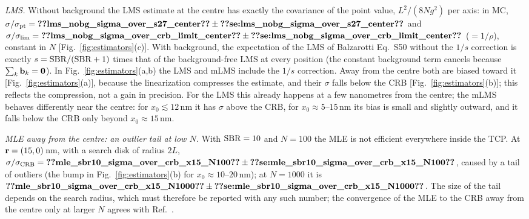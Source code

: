 \emph{LMS.} Without background the LMS estimate at the centre has exactly the covariance of the
point value, $L^2/(8Ng^2)$ per axis: in MC,
$\sigma/\sigma_{\mathrm{pt}}=\pnum{lms_nobg_sigma_over_s27_center}\pm\pnumse{lms_nobg_sigma_over_s27_center}$
and $\sigma/\sigma_{\lim}=\pnum{lms_nobg_sigma_over_crb_limit_center}\pm\pnumse{lms_nobg_sigma_over_crb_limit_center}$
($=1/\rho$), constant in $N$ [Fig.~\ref{fig:estimators}(c)]. With background, the expectation of the LMS of
Balzarotti Eq.~S50 without the $1/s$ correction is exactly $s=\mathrm{SBR}/(\mathrm{SBR}+1)$ times that of the
background-free LMS at every position (the constant background term cancels
because $\sum_k\mathbf{b}_k=\mathbf0$). In Fig.~\ref{fig:estimators}(a,b) the LMS and mLMS include the
$1/s$ correction. Away from the centre both are biased toward it
[Fig.~\ref{fig:estimators}(a)], because the linearization compresses the estimate, and their
$\sigma$ falls below the CRB [Fig.~\ref{fig:estimators}(b)]; this reflects the compression, not a
gain in precision. For the LMS this already happens at a few nanometres from the centre; the mLMS
behaves differently near the centre: for $x_0\lesssim12$\,nm it has $\sigma$ above the CRB, for
$x_0\approx5$--$15$\,nm its bias is small and slightly outward, and it falls below the CRB only
beyond $x_0\approx15$\,nm.

\emph{MLE away from the centre: an outlier tail at low $N$.} With $\mathrm{SBR}=10$ and $N=100$ the MLE
is not efficient everywhere inside the TCP. At $\mathbf{r}=(15,0)$\,nm, with a search disk of radius
$2L$, $\sigma/\crb=\pnum{mle_sbr10_sigma_over_crb_x15_N100}\pm\pnumse{mle_sbr10_sigma_over_crb_x15_N100}$,
caused by a tail of outliers (the bump in Fig.~\ref{fig:estimators}(b) for $x_0\approx10$--$20$\,nm);
at $N=1000$ it is
$\pnum{mle_sbr10_sigma_over_crb_x15_N1000}\pm\pnumse{mle_sbr10_sigma_over_crb_x15_N1000}$.
The size of the tail depends on the search radius, which must therefore be reported with any
such number; the convergence of the MLE to the CRB away from the centre only at larger $N$ agrees
with Ref.~\cite{Balzarotti2017}.


